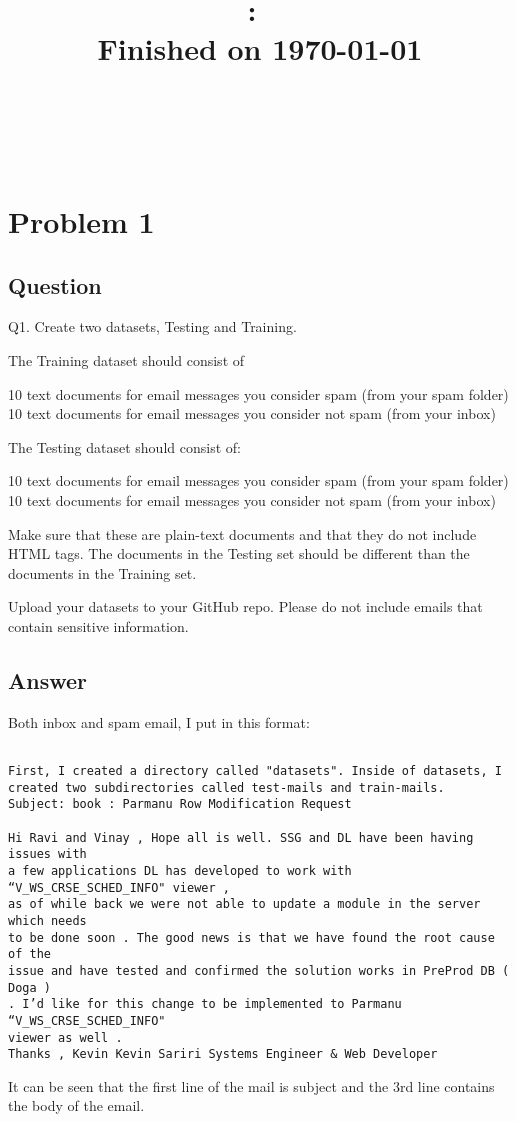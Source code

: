 \documentclass[letterpaper,12pt]{article}
\title{
\vspace{2in}
\textmd{\textbf{\Class:\ \AssignmentTitle}}\\
\normalsize\vspace{0.1in}\small{Finished on \today}\\
\vspace{0.1in}\large{\textit{\Instructor\ }}
\vspace{3in}
}
\author{\textbf{\MyName} \\ \MyEmail}
\date{}
\begin{document}
\begin{titlepage}
\clearpage\maketitle
\thispagestyle{empty}
\end{titlepage}


\newpage
\clearpage
\tableofcontents
\listoffigures
\thispagestyle{empty}
\newpage
\section{Problem 1}

\subsection{Question}
\vspace*{10pt}
Q1. Create two datasets, Testing and Training.

The Training dataset should consist of

    10 text documents for email messages you consider spam (from your spam folder)
    10 text documents for email messages you consider not spam (from your inbox)

The Testing dataset should consist of:

    10 text documents for email messages you consider spam (from your spam folder)
    10 text documents for email messages you consider not spam (from your inbox)

Make sure that these are plain-text documents and that they do not include HTML tags. The documents in the Testing set should be different than the documents in the Training set.

Upload your datasets to your GitHub repo. Please do not include emails that contain sensitive information.

\subsection{Answer}
\vspace{2mm}

Both inbox and spam email, I put in this format:

\begin{verbatim}

First, I created a directory called "datasets". Inside of datasets, I created two subdirectories called test-mails and train-mails.
Subject: book : Parmanu Row Modification Request

Hi Ravi and Vinay , Hope all is well. SSG and DL have been having issues with 
a few applications DL has developed to work with “V_WS_CRSE_SCHED_INFO" viewer , 
as of while back we were not able to update a module in the server which needs
to be done soon . The good news is that we have found the root cause of the 
issue and have tested and confirmed the solution works in PreProd DB ( Doga )
. I’d like for this change to be implemented to Parmanu “V_WS_CRSE_SCHED_INFO"
viewer as well . 
Thanks , Kevin Kevin Sariri Systems Engineer & Web Developer
\end{verbatim}
It can be seen that the first line of the mail is subject and the 3rd line contains the body of the email. 
\end{document}
